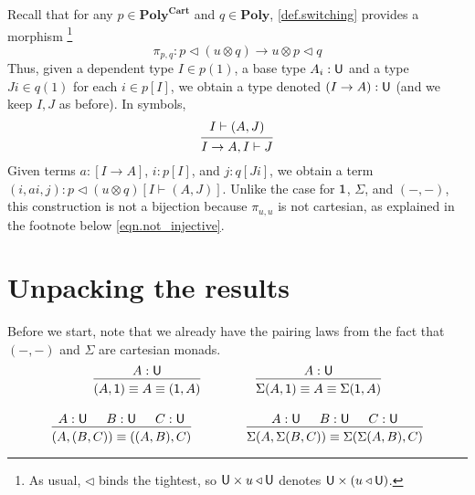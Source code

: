 \documentclass[11pt, one side, article]{memoir}
\theoremstyle{definition}
\theoremstyle{plain}
\newcommand{\Cat}[1]{\mathbf{#1}}%
\newcommand{\tn}[1]{\textnormal{#1}}
\newcommand{\poly}{\Cat{Poly}}
\newcommand{\polycart}{\poly^{\Cat{Cart}}}
\newcommand{\0}{\textsf{0}}
\newcommand{\1}{\tn{\textsf{1}}}
\newcommand{\U}{\tn{\textsf{U}}}
\newcommand{\tri}{\mathbin{\triangleleft}}
\newcommand{\switch}{\pi}
\begin{document}
Recall that for any $p\in\polycart$ and $q\in\poly$, \cref{def.switching} provides a morphism%
\footnote{As usual, $\tri$ binds the tightest, so $\U\times u\tri \U$ denotes $\U\times(u\tri \U)$.}
\[\switch_{p,q}\colon p\tri (u\otimes q)\to u\otimes p\tri q\]
Thus, given a dependent type $I\in p(1)$, a base type $A_i:\U$ and a type $J i\in q(1)$ for each $i\in p[I]$, we obtain a type denoted $(I\to A):\U$ (and we keep $I,J$ as before). In symbols,
\begin{equation*}
  \begin{prooftree}
    \Hypo{I\vdash (A, J)}
    \Infer1{I\to A, I\vdash J}
  \end{prooftree}
\end{equation*}
Given terms $a:[I\to A]$, $i:p[I]$, and $j:q[Ji]$, we obtain a term $(i,a i, j):p\tri(u\otimes q)[I\vdash (A,J)]$. Unlike the case for $\1$, $\Sigma$, and $(-,-)$, this construction is not a bijection because $\switch_{u,u}$ is not cartesian, as explained in the footnote below \cref{eqn.not_injective}.

\section{Unpacking the results}


Before we start, note that we already have the pairing laws from the fact that $(-,-)$ and $\Sigma$ are cartesian monads.
\begin{gather*}
\begin{prooftree}
	\Hypo{A:\U}
	\Infer1{(A,\1)\equiv A\equiv (\1,A)}
\end{prooftree}
\hspace{.6in}
\begin{prooftree}
	\Hypo{A:\U}
	\Infer1{\Sigma(A,\1)\equiv A\equiv \Sigma(\1,A)}
\end{prooftree}
\\[10pt]
\begin{prooftree}
	\Hypo{A:\U}
	\Hypo{B:\U}
	\Hypo{C:\U}
	\Infer3{(A,(B,C))\equiv ((A,B),C)}
\end{prooftree}
\hspace{.6in}
\begin{prooftree}
	\Hypo{A:\U}
	\Hypo{B:\U}
	\Hypo{C:\U}
	\Infer3{\Sigma(A,\Sigma(B,C))\equiv \Sigma(\Sigma(A,B),C)}
\end{prooftree}
\end{gather*}
\end{document}
